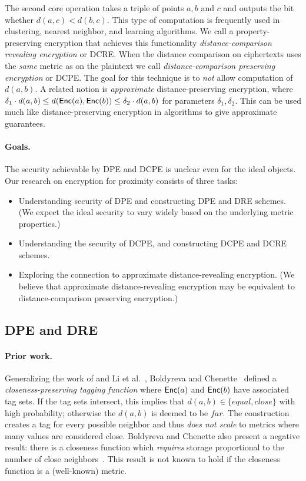 The second core operation takes a triple of points $a,b$ and $c$ and outputs the bit whether $d(a,c)<d(b,c)$.  This type of computation is frequently used in clustering, nearest neighbor, and learning algorithms.   We call a property-preserving encryption that achieves this functionality \emph{distance-comparison revealing encryption} or DCRE. When the distance comparison on ciphertexts uses the \emph{same} metric as on the plaintext we call \emph{distance-comparison preserving encryption} or DCPE.  The goal for this technique is to \emph{not} allow computation of $d(a,b)$.
 A related notion is \emph{approximate} distance-preserving encryption, where  $\delta_1 \cdot d(a,b) \leq d(\mathsf{Enc}(a), \mathsf{Enc}(b)) \leq \delta_2  \cdot d(a,b)$ for parameters $\delta_1, \delta_2$.  This can be used much like distance-preserving encryption in algorithms to give approximate guarantees.

\paragraph{Goals.}
The security achievable by DPE and DCPE is unclear even for the ideal objects.
Our research on encryption for proximity  consists of three tasks:
\begin{itemize}\setlength{\itemsep}{0em}
\item Understanding security of DPE and constructing DPE and DRE
schemes. (We expect the ideal security to vary widely based on the underlying metric
properties.)
\item Understanding the security of DCPE, and constructing DCPE and DCRE
schemes.
\item Exploring the connection to approximate distance-revealing
encryption. (We believe that approximate distance-revealing encryption
may be equivalent to distance-comparison preserving encryption.)
\end{itemize}

\subsection{DPE and DRE}

\paragraph{Prior work.}
Generalizing the work of and Li
et al.~\cite{li2010fuzzy,wang2013efficient},
Boldyreva and Chenette~\cite{boldyreva2014efficient}
defined a
\emph{closeness-preserving tagging function} where $\mathsf{Enc}(a)$ and
$\mathsf{Enc}(b)$ have associated tag sets.  If the tag sets intersect, this
implies that $d(a,b) \in\{equal, close\}$ with high probability;
otherwise the $d(a,b)$ is deemed to be $far$.
%
The construction creates a tag for every possible neighbor and thus {\em
does not scale} to metrics where many values are considered close.
Boldyreva and Chenette also present a negative result: there is a
closeness function which \emph{requires} storage
proportional to the number of close neighbors~\cite[Theorem
5.2]{boldyreva2014efficient}.  This result is not known to hold if the
closeness function is a (well-known) metric.  

